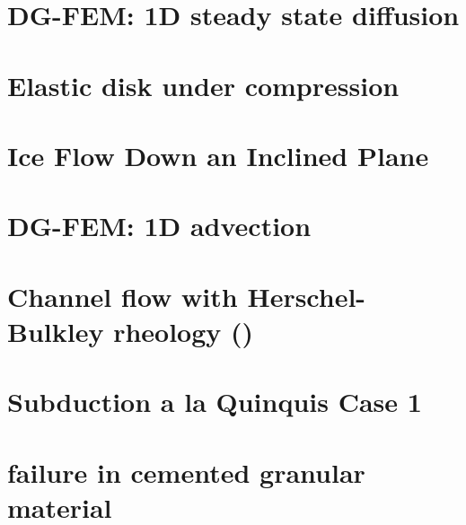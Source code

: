 \documentclass[a4paper,11pt]{report}
\begin{document}
\chapter{DG-FEM: 1D steady state diffusion \label{f57}} %

\chapter{Elastic disk under compression \label{f58}} %

\chapter{Ice Flow Down an Inclined Plane \label{f59}} %

\chapter{DG-FEM: 1D advection \label{f60}} %

\chapter{Channel flow with Herschel-Bulkley rheology (\QtwoQone) \label{f61}} %

\chapter{Subduction a la Quinquis Case 1 \label{f62}} %

\chapter{failure in cemented granular material \label{f63}} %
\end{document}

